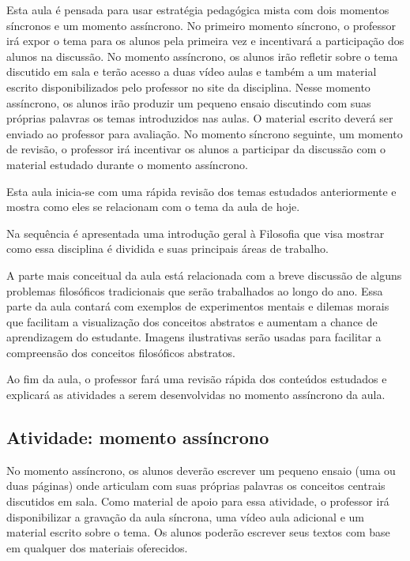 \documentclass[
	article,			%
	12pt,				%
	twoside,			%
	a4paper,			%
	english,			%
	brazil,				%
	sumario=tradicional
]{plano}
\begin{document}
Esta aula é pensada para usar estratégia pedagógica mista com dois momentos síncronos e um momento assíncrono. No primeiro momento síncrono, o professor irá expor o tema para os alunos pela primeira vez e incentivará a participação dos alunos na discussão. No momento assíncrono, os alunos irão refletir sobre o tema discutido em sala e terão acesso a duas vídeo aulas e também a um material escrito disponibilizados pelo professor no site da disciplina. Nesse momento assíncrono, os alunos irão produzir um pequeno ensaio discutindo com suas próprias palavras os temas introduzidos nas aulas. O material escrito deverá ser enviado ao professor para avaliação. No momento síncrono seguinte, um momento de revisão, o professor irá incentivar os alunos a participar da discussão com o material estudado durante o momento assíncrono.

Esta aula inicia-se com uma rápida revisão dos temas estudados anteriormente e mostra como eles se relacionam com o tema da aula de hoje.

Na sequência é apresentada uma introdução geral à Filosofia que visa mostrar como essa disciplina é dividida e suas principais áreas de trabalho. 

A parte mais conceitual da aula está relacionada com a breve discussão de alguns problemas filosóficos tradicionais que  serão trabalhados ao longo do ano. Essa parte da aula contará com exemplos de experimentos mentais e dilemas morais que facilitam a visualização dos conceitos abstratos e aumentam a chance de aprendizagem do estudante. Imagens ilustrativas serão usadas para facilitar a compreensão dos conceitos filosóficos abstratos.

Ao fim da aula, o professor fará uma revisão rápida dos conteúdos estudados e explicará as atividades a serem desenvolvidas no momento assíncrono da aula.

\begin{snugshade}
	\section{Atividade: momento assíncrono} %
\end{snugshade}

No momento assíncrono, os alunos deverão escrever um pequeno ensaio (uma ou duas páginas) onde articulam com suas próprias palavras os conceitos centrais discutidos em sala. Como material de apoio para essa atividade, o professor irá disponibilizar a gravação da aula síncrona, uma vídeo aula adicional e um material escrito sobre o tema. Os alunos poderão escrever seus textos com base em qualquer dos materiais oferecidos.
\end{document}

